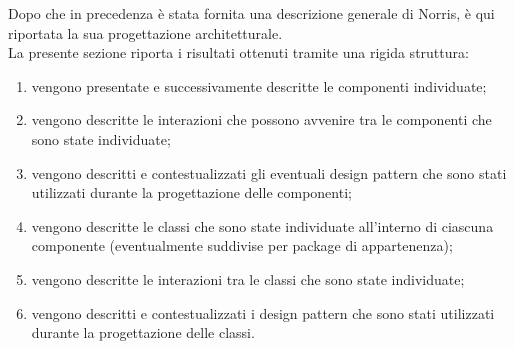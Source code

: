 	Dopo che in precedenza è stata fornita una descrizione generale di Norris, è qui riportata la sua progettazione architetturale.\\
	La presente sezione riporta i risultati ottenuti tramite una rigida struttura:
	\begin{enumerate}
		\item vengono presentate e successivamente descritte le componenti individuate;
		\item vengono descritte le interazioni che possono avvenire tra le componenti che sono state individuate;
		\item vengono descritti e contestualizzati gli eventuali design pattern che sono stati utilizzati durante la progettazione delle componenti;
		\item vengono descritte le classi che sono state individuate all'interno di ciascuna componente (eventualmente suddivise per package di appartenenza);
		\item vengono descritte le interazioni tra le classi che sono state individuate;
		\item vengono descritti e contestualizzati i design pattern che sono stati utilizzati durante la progettazione delle classi.
	\end{enumerate}

